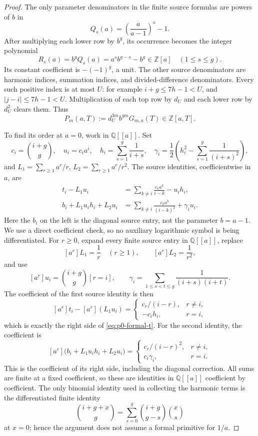 \begin{proof}
The only parameter denominators in the finite source formulas are powers of
$b$ in
\[
 Q_s(a)=\left(\frac{a}{a-1}\right)^s-1.
\]
After multiplying each lower row by $b^g$, its occurrence becomes the integer
polynomial
\[
 R_s(a)=b^gQ_s(a)=a^s b^{g-s}-b^g\in\mathbb Z[a]
 \quad(1\le s\le g).
\]
Its constant coefficient is $-(-1)^g$, a unit.  The other source
denominators are harmonic indices, summation indices, and divided-difference
denominators.  Every such positive index is at most $U$: for example
$i+g\le7h-1<U$, and $|j-i|\le7h-1<U$.  Multiplication of each top row by
$d_U$ and each lower row by $d_U^2$ clears them.  Thus
\[
 P_m(a,T):=d_U^{3m}b^{gm}G_{m,a}(T)\in\mathbb Z[a,T].
\]

To find its order at $a=0$, work in $\mathbb Q[[a]]$.  Set
\[
 c_i=\binom{i+g}{g},\quad u_i=c_i a^i,\quad
 h_i=\sum_{s=1}^g\frac1{i+s},\quad
 \gamma_i=\frac12\left(h_i^2-\sum_{s=1}^g\frac1{(i+s)^2}\right),
\]
and $L_1=\sum_{r\ge1}a^r/r$, $L_2=\sum_{r\ge1}a^r/r^2$.  The source
identities, coefficientwise in $a$, are
\begin{align}
 t_i-L_1u_i&=\sum_{k\ne i}\frac{c_ka^k}{i-k}-u_i h_i,
 \label{eq:p0-formal-t}\\
 b_i+L_1u_i h_i+L_2u_i
 &=\sum_{k\ne i}\frac{c_ka^k}{(i-k)^2}+\gamma_i u_i.
 \label{eq:p0-formal-b}
\end{align}
Here the $b_i$ on the left is the diagonal source entry, not the parameter
$b=a-1$.  We use a direct coefficient check, so no auxiliary logarithmic
symbol is being differentiated.  For $r\ge0$, expand every finite source
entry in $\mathbb Q[[a]]$, replace
\[
 [a^r]L_1=\frac1r\quad(r\ge1),\qquad
 [a^r]L_2=\frac1{r^2},
\]
and use
\[
 [a^r]u_i=\binom{i+g}{g}[r=i],\qquad
 \gamma_i=\sum_{1\le s<t\le g}\frac1{(i+s)(i+t)}.
\]
The coefficient of the first source identity is then
\[
 [a^r]t_i-[a^r](L_1u_i)=
 \begin{cases}c_r/(i-r),&r\ne i,\\-c_i h_i,&r=i,\end{cases}
\]
which is exactly the right side of \eqref{eq:p0-formal-t}.  For the second
identity, the coefficient is
\[
 [a^r]\bigl(b_i+L_1u_i h_i+L_2u_i\bigr)=
 \begin{cases}c_r/(i-r)^2,&r\ne i,\\c_i\gamma_i,&r=i.\end{cases}
\]
This is the coefficient of its right side, including the diagonal correction.
All sums are finite at a fixed coefficient, so these are identities in
$\mathbb Q[[a]]$ coefficient by coefficient.  The only binomial identity
used in collecting the harmonic terms is the differentiated finite identity
\[
 \binom{i+g+x}{g}=\sum_{s=0}^g\binom{i+g}{g-s}\binom{x}{s}
\]
at $x=0$; hence the argument does not assume a formal primitive for $1/a$.


\end{proof}
